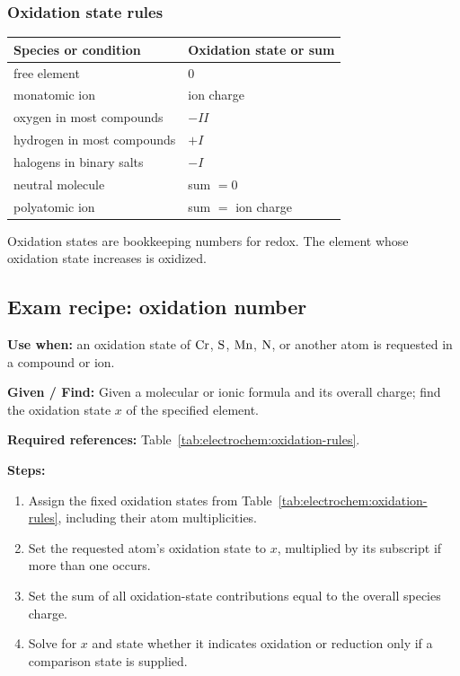 \subsubsection{Oxidation state rules}
\begin{tabular}{@{}ll@{}}
\toprule
\textbf{Species or condition} & \textbf{Oxidation state or sum}\\
\midrule
free element & \(0\)\\
monatomic ion & ion charge\\
oxygen in most compounds & \(-II\)\\
hydrogen in most compounds & \(+I\)\\
halogens in binary salts & \(-I\)\\
neutral molecule & sum \(=0\)\\
polyatomic ion & sum \(=\) ion charge\\
\bottomrule
\end{tabular}
Oxidation states are bookkeeping numbers for redox. The element whose oxidation state increases is oxidized.

\subsection{Exam recipe: oxidation number}
\textbf{Use when:} an oxidation state of \(\ce{Cr}\), \(\ce{S}\), \(\ce{Mn}\), \(\ce{N}\), or another atom is requested in a compound or ion.

\textbf{Given / Find:} Given a molecular or ionic formula and its overall charge; find the oxidation state \(x\) of the specified element.

\textbf{Required references:} Table~\ref{tab:electrochem:oxidation-rules}.

\textbf{Steps:}
\begin{enumerate}
    \item Assign the fixed oxidation states from Table~\ref{tab:electrochem:oxidation-rules}, including their atom multiplicities.
    \item Set the requested atom's oxidation state to \(x\), multiplied by its subscript if more than one occurs.
    \item Set the sum of all oxidation-state contributions equal to the overall species charge.
    \item Solve for \(x\) and state whether it indicates oxidation or reduction only if a comparison state is supplied.
\end{enumerate}


